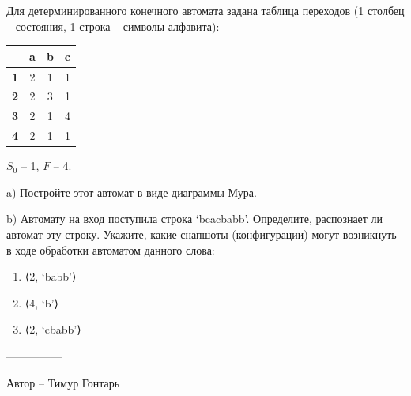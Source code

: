 \question
Для детерминированного конечного автомата задана таблица переходов (1 столбец – состояния, 1 строка – символы алфавита):

\begin{tabular}{||c | c | c | c||} 
 \hline
 & \textbf{a} & \textbf{b} & \textbf{c} \\ 
 \hline\hline
 \textbf{1} & 2 & 1 & 1 \\ 
 \hline
 \textbf{2} & 2 & 3 & 1 \\
 \hline
 \textbf{3} & 2 & 1 & 4 \\
 \hline
 \textbf{4} & 2 & 1 & 1 \\
 \hline
\end{tabular}

$S_0$ – 1, $F$ – {4}.

a) Постройте этот автомат в виде диаграммы Мура.

b) Автомату на вход поступила строка ‘bcacbabb’. Определите, распознает ли автомат эту строку. Укажите, какие снапшоты (конфигурации) могут возникнуть в ходе обработки автоматом данного слова:

\begin{enumerate}
    \item ⟨2, ‘babb’⟩
    \item ⟨4, ‘b’⟩
    \item ⟨2, ‘cbabb’⟩
\end{enumerate}

---------------

Автор -- Тимур Гонтарь
